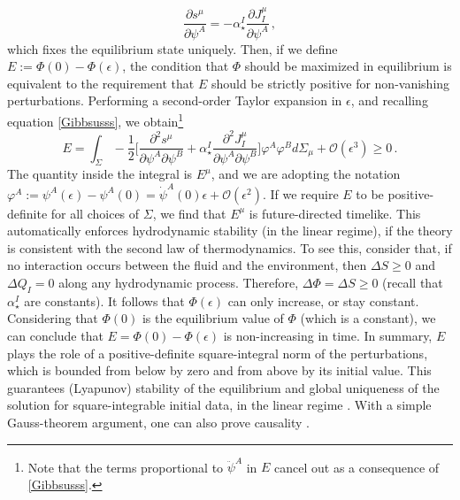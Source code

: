 \documentclass[aps,prl,singlecolumn,nofootinbib]{revtex4-2}
\theoremstyle{definition}
\theoremstyle{theorem}
\begin{document}
\begin{equation}\label{Gibbsusss}
\dfrac{\partial s^\mu}{\partial \psi^A} = -\alpha_\star^I \dfrac{\partial J^\mu_I}{\partial \psi^A} \, ,
\end{equation}
which fixes the equilibrium state uniquely. Then, if we define $E:=\Phi(0)-\Phi(\epsilon)$, the condition that $\Phi$ should be maximized in equilibrium is equivalent to the requirement that $E$ should be strictly positive for non-vanishing perturbations. Performing a second-order Taylor expansion in $\epsilon$, and recalling equation \eqref{Gibbsusss}, we obtain\footnote{Note that the terms proportional to $\ddot{\psi}^A$ in $E$ cancel out as a consequence of \eqref{Gibbsusss}. }
\begin{equation}
E = \int_\Sigma -\dfrac{1}{2}\bigg[\dfrac{\partial^2 s^\mu}{\partial \psi^A \partial \psi^B} + \alpha_\star^I\dfrac{\partial^2 J^\mu_I}{\partial \psi^A \partial \psi^B}  \bigg] \varphi^A \varphi^B d\Sigma_\mu +\mathcal{O}(\epsilon^3) \geq 0  \, .
\end{equation}
The quantity inside the integral is $E^\mu$, and we are adopting the notation $\varphi^A:= \psi^A(\epsilon)-\psi^A(0)=\dot{\psi}^A(0) \epsilon+\mathcal{O}(\epsilon^2)$. If we require $E$ to be positive-definite for all choices of $\Sigma$, we find that $E^\mu$ is future-directed timelike. This automatically enforces hydrodynamic stability (in the linear regime), if the theory is consistent with the second law of thermodynamics. To see this, consider that, if no interaction occurs between the fluid and the environment, then $\Delta S \geq 0$ and $\Delta Q_I=0$ along any hydrodynamic process. Therefore, $\Delta \Phi=\Delta S \geq 0$ (recall that $\alpha_\star^I$ are constants). It follows that $\Phi(\epsilon)$ can only increase, or stay constant. Considering that $\Phi(0)$ is the equilibrium value of $\Phi$ (which is a constant), we can conclude that $E=\Phi(0)-\Phi(\epsilon)$ is non-increasing in time. In summary, $E$ plays the role of a positive-definite square-integral norm of the perturbations, which is bounded from below by zero and from above by its initial value. This guarantees (Lyapunov) stability of the equilibrium and global uniqueness of the solution for square-integrable initial data, in the linear regime \cite{Wald}. With a simple Gauss-theorem argument, one can also prove causality \cite{GavassinoCausality2021}.
\end{document}
